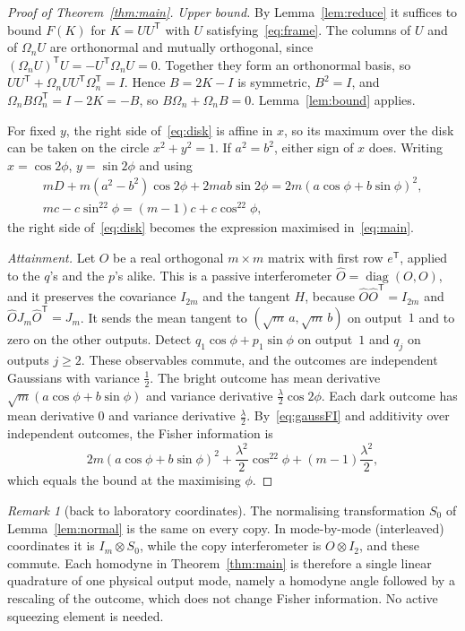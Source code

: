 \documentclass[11pt,a4paper]{article}
\theoremstyle{definition}\newtheorem{definition}{Definition}
\theoremstyle{remark}\newtheorem{remark}{Remark}
\newcommand{\diag}{\operatorname{diag}}
\begin{document}
\begin{proof}[Proof of Theorem~\ref{thm:main}]
\emph{Upper bound.} By Lemma~\ref{lem:reduce} it suffices to bound $F(K)$ for $K=UU^{\mathsf T}$ with $U$ satisfying~\eqref{eq:frame}. The columns of $U$ and of $\Omega_nU$ are orthonormal and mutually orthogonal, since $(\Omega_nU)^{\mathsf T}U=-U^{\mathsf T}\Omega_nU=0$. Together they form an orthonormal basis, so $UU^{\mathsf T}+\Omega_nUU^{\mathsf T}\Omega_n^{\mathsf T}=I$. Hence $B=2K-I$ is symmetric, $B^2=I$, and $\Omega_nB\Omega_n^{\mathsf T}=I-2K=-B$, so $B\Omega_n+\Omega_nB=0$. Lemma~\ref{lem:bound} applies.

For fixed $y$, the right side of~\eqref{eq:disk} is affine in $x$, so its maximum over the disk can be taken on the circle $x^2+y^2=1$. If $a^2=b^2$, either sign of $x$ does. Writing $x=\cos2\phi$, $y=\sin2\phi$ and using
\[
\begin{gathered}
mD+m(a^2-b^2)\cos2\phi+2mab\sin2\phi=2m(a\cos\phi+b\sin\phi)^2,\\
mc-c\sin^22\phi=(m-1)c+c\cos^22\phi,
\end{gathered}
\]
the right side of~\eqref{eq:disk} becomes the expression maximised in~\eqref{eq:main}.

\emph{Attainment.} Let $O$ be a real orthogonal $m\times m$ matrix with first row $e^{\mathsf T}$, applied to the $q$'s and the $p$'s alike. This is a passive interferometer $\hat O=\diag(O,O)$, and it preserves the covariance $I_{2m}$ and the tangent $H$, because $\hat O\hat O^{\mathsf T}=I_{2m}$ and $\hat OJ_m\hat O^{\mathsf T}=J_m$. It sends the mean tangent to $(\sqrt m\,a,\sqrt m\,b)$ on output~$1$ and to zero on the other outputs. Detect $q_1\cos\phi+p_1\sin\phi$ on output~$1$ and $q_j$ on outputs $j\ge2$. These observables commute, and the outcomes are independent Gaussians with variance $\tfrac12$. The bright outcome has mean derivative $\sqrt m(a\cos\phi+b\sin\phi)$ and variance derivative $\tfrac\lambda2\cos2\phi$. Each dark outcome has mean derivative $0$ and variance derivative $\tfrac\lambda2$. By~\eqref{eq:gaussFI} and additivity over independent outcomes, the Fisher information is
\[
2m(a\cos\phi+b\sin\phi)^2+\frac{\lambda^2}{2}\cos^22\phi+(m-1)\frac{\lambda^2}{2},
\]
which equals the bound at the maximising $\phi$.
\end{proof}

\begin{remark}[back to laboratory coordinates]
The normalising transformation $S_0$ of Lemma~\ref{lem:normal} is the same on every copy. In mode-by-mode (interleaved) coordinates it is $I_m\otimes S_0$, while the copy interferometer is $O\otimes I_2$, and these commute. Each homodyne in Theorem~\ref{thm:main} is therefore a single linear quadrature of one physical output mode, namely a homodyne angle followed by a rescaling of the outcome, which does not change Fisher information. No active squeezing element is needed.
\end{remark}
\end{document}
